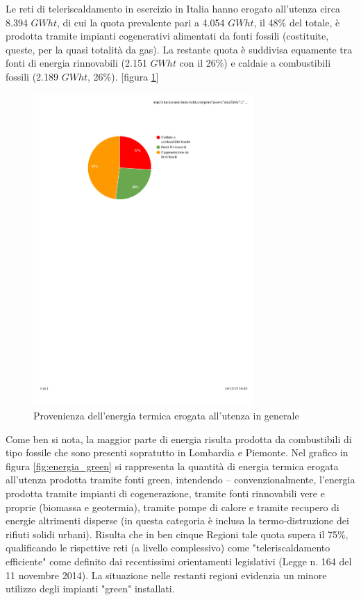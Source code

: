 \documentclass[laurea,oneside,11pt]{USiena_tesiLM}
\begin{document}
Le reti di teleriscaldamento in esercizio in Italia hanno erogato all'utenza circa 8.394 $GWht$, di cui la quota prevalente pari a 4.054 $GWht$, il 48\% del totale, è prodotta tramite impianti cogenerativi alimentati da fonti fossili (costituite, queste, per la quasi totalità da gas). La restante quota è suddivisa equamente tra fonti di energia rinnovabili (2.151 $GWht$ con il 26\%) e caldaie a combustibili fossili (2.189 $GWht$, 26\%). [figura \ref{fig:torta}]

\begin{figure}[!ht]
\centering
\includegraphics[width=0.75\textwidth]{figure/torta_energia} 
\caption{Provenienza dell'energia termica erogata all'utenza in generale}
\label{fig:torta}
\end{figure}

Come ben si nota, la maggior parte di energia risulta prodotta da combustibili di tipo fossile che sono presenti sopratutto in Lombardia e Piemonte.
Nel grafico in figura \ref{fig:energia_green} si rappresenta la quantità di energia termica erogata all'utenza prodotta tramite fonti green, intendendo – convenzionalmente, l'energia prodotta tramite impianti di cogenerazione, tramite fonti rinnovabili vere e proprie (biomassa e geotermia), tramite pompe di calore e tramite recupero di energie altrimenti disperse (in questa categoria è inclusa la termo-distruzione dei rifiuti solidi urbani).
Risulta che in ben cinque Regioni tale quota supera il 75\%, qualificando le rispettive reti (a livello complessivo) come "teleriscaldamento efficiente" come definito dai recentissimi orientamenti legislativi (Legge n. 164 del 11 novembre 2014).
La situazione nelle restanti regioni evidenzia un minore utilizzo degli impianti "green" installati.
\end{document}
